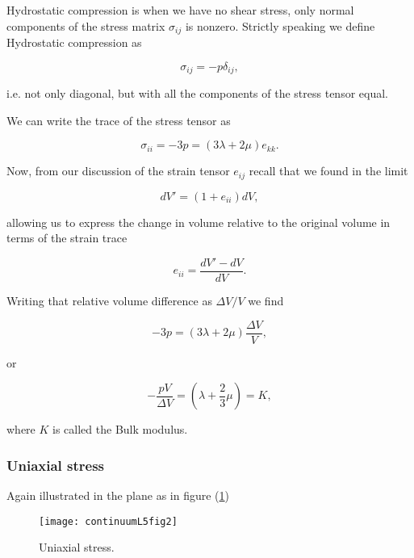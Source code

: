 Hydrostatic compression is when we have no shear stress, only normal components of the stress matrix $\sigma_{ij}$ is nonzero.  Strictly speaking we define Hydrostatic compression as

\begin{equation}\label{eqn:continuumL5:170}
\sigma_{ij} = -p \delta_{ij},
\end{equation}

i.e. not only diagonal, but with all the components of the stress tensor equal.

We can write the trace of the stress tensor as

\begin{equation}\label{eqn:continuumL5:190}
\sigma_{ii} = - 3 p = (3 \lambda + 2 \mu) e_{kk}.
\end{equation}

Now, from our discussion of the strain tensor $e_{ij}$ recall that we found in the limit

\begin{equation}\label{eqn:continuumL5:210}
dV' = (1 + e_{ii}) dV,
\end{equation}

allowing us to express the change in volume relative to the original volume in terms of the strain trace

\begin{equation}\label{eqn:continuumL5:230}
e_{ii} = \frac{dV' - dV}{dV}.
\end{equation}

Writing that relative volume difference as $\Delta V/V$ we find

\begin{equation}\label{eqn:continuumL5:250}
- 3 p = (3 \lambda + 2 \mu) \frac{\Delta V}{V},
\end{equation}

or

\begin{equation}\label{eqn:continuumL5:270}
- \frac{ p V}{\Delta V} = \left( \lambda + \frac{2}{3} \mu \right) = K,
\end{equation}

where $K$ is called the Bulk modulus.

\subsubsection{Uniaxial stress}

Again illustrated in the plane as in figure (\ref{fig:continuumL5:continuumL5fig2})
\begin{figure}[htp]
   \centering
   \texttt{[image: continuumL5fig2]}
   \caption{Uniaxial stress.}\label{fig:continuumL5:continuumL5fig2}
\end{figure}

